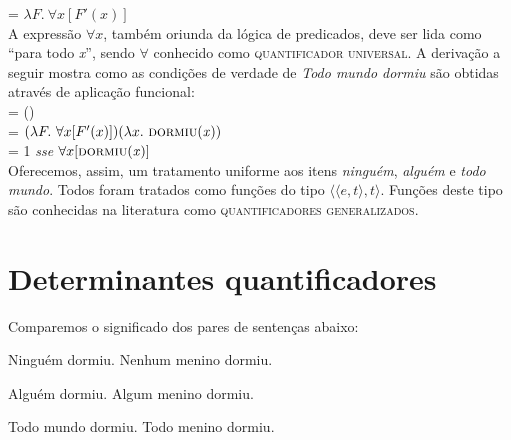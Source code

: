 \n {} = $\lambda F.\ \forall
x [F'(x)]$\\

A expressão \underline{$\forall x$}, também oriunda da lógica de predicados, deve ser lida como ``para todo \textit{x}'', sendo $\forall$ conhecido como \textsc{quantificador universal}. A derivação a seguir mostra como as condições de verdade de
\textit{Todo mundo dormiu} são obtidas através de aplicação
funcional:\\

\n {} = ()\\

\n = $(\lambda F.\ \forall x [F'(x)])(\lambda x.\ \predica{dormiu}{x})$\\

\n = 1 \textit{sse} $\forall x [ \text{\textsc{dormiu}(\textit{x})}]$\\

Oferecemos, assim, um tratamento uniforme aos itens \textit{ninguém},
\textit{alguém} e \textit{todo mundo}. Todos foram tratados como funções do tipo
$\langle\langle e,t\rangle,t\rangle$. Funções deste tipo são
conhecidas na literatura como \textsc{quantificadores
generalizados}.

\section{Determinantes quantificadores}

Comparemos o significado dos pares de sentenças abaixo:

\begin{exe}
\ex\label{nin}
\begin{xlist}
\ex Ninguém dormiu.\label{nina}
\ex Nenhum menino dormiu.\label{ninb}
\end{xlist}
\end{exe}

\begin{exe}
\ex\label{alg}
\begin{xlist}
\ex Alguém dormiu.\label{alga}
\ex Algum menino dormiu.\label{algb}
\end{xlist}
\end{exe}

\begin{exe}
\ex\label{tod}
\begin{xlist}
\ex Todo mundo dormiu.\label{toda}
\ex Todo menino dormiu.\label{todb}
\end{xlist}
\end{exe}

